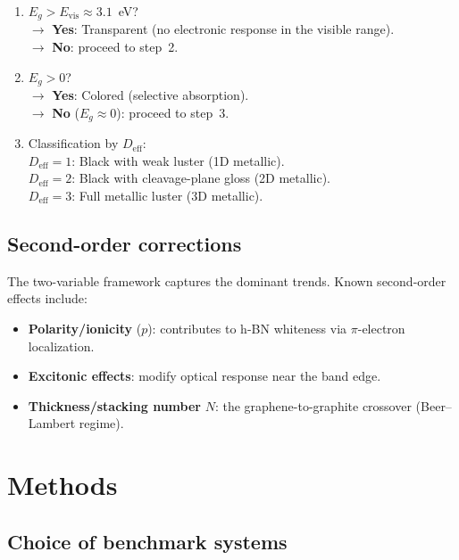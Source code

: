 \documentclass[twocolumn,showpacs,preprintnumbers,amsmath,amssymb,prb]{revtex4-2}
\begin{document}
\begin{enumerate}
  \item $E_g > E_\mathrm{vis} \approx 3.1$~eV? \\
    $\to$ \textbf{Yes}: Transparent (no electronic response in the
    visible range). \\
    $\to$ \textbf{No}: proceed to step~2.
  \item $E_g > 0$? \\
    $\to$ \textbf{Yes}: Colored (selective absorption). \\
    $\to$ \textbf{No} ($E_g \approx 0$): proceed to step~3.
  \item Classification by $D_\mathrm{eff}$: \\
    $D_\mathrm{eff} = 1$: Black with weak luster (1D metallic). \\
    $D_\mathrm{eff} = 2$: Black with cleavage-plane gloss (2D metallic). \\
    $D_\mathrm{eff} = 3$: Full metallic luster (3D metallic).
\end{enumerate}

\subsection{Second-order corrections}

The two-variable framework captures the dominant trends. Known
second-order effects include:
\begin{itemize}
  \item \textbf{Polarity/ionicity} ($p$): contributes to h-BN whiteness
    via $\pi$-electron localization.
  \item \textbf{Excitonic effects}: modify optical response near the
    band edge.
  \item \textbf{Thickness/stacking number} $N$: the graphene-to-graphite
    crossover (Beer--Lambert regime).
\end{itemize}

\section{Methods}
\label{sec:methods}

\subsection{Choice of benchmark systems}
\end{document}
